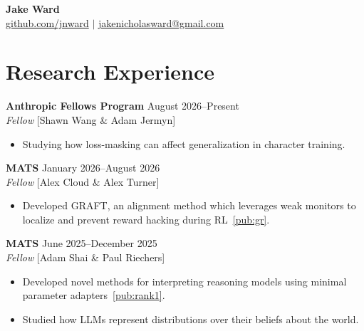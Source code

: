 \documentclass[11pt,a4paper]{article}
\begin{document}
\begin{center}
    {\LARGE \textbf{Jake Ward}} \\
    \vspace{3pt}
    \href{https://github.com/jnward}{github.com/jnward} $|$ 
    \href{mailto:jakenicholasward@gmail.com}{jakenicholasward@gmail.com}
\end{center}

\section{Research Experience}

\textbf{Anthropic Fellows Program} \hfill August 2026--Present \\
\textit{Fellow} [Shawn Wang \& Adam Jermyn]
\begin{itemize}[noitemsep,topsep=2pt,leftmargin=15pt,label=\textendash]
    \item Studying how loss-masking can affect generalization in character training.
\end{itemize}
\vspace{5pt}

\textbf{MATS} \hfill January 2026--August 2026 \\
\textit{Fellow} [Alex Cloud \& Alex Turner]
\begin{itemize}[noitemsep,topsep=2pt,leftmargin=15pt,label=\textendash]
    \item Developed GRAFT, an alignment method which leverages weak monitors to localize and prevent reward hacking during RL~\ref{pub:gr}.
\end{itemize}
\vspace{5pt}

\textbf{MATS} \hfill June 2025--December 2025 \\
\textit{Fellow} [Adam Shai \& Paul Riechers]
\begin{itemize}[noitemsep,topsep=2pt,leftmargin=15pt,label=\textendash]
    \item Developed novel methods for interpreting reasoning models using minimal parameter adapters~\ref{pub:rank1}.
    \item Studied how LLMs represent distributions over their beliefs about the world.
\end{itemize}
\vspace{5pt}

\end{document}
